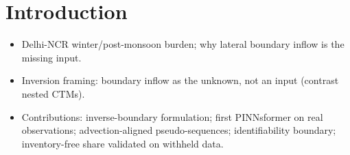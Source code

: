 \section{Introduction}
\begin{itemize}
  \item Delhi-NCR winter/post-monsoon burden; why lateral boundary inflow is the missing input.
  \item Inversion framing: boundary inflow as the unknown, not an input (contrast nested CTMs).
  \item Contributions: inverse-boundary formulation; first PINNsformer on real observations; advection-aligned pseudo-sequences; identifiability boundary; inventory-free share validated on withheld data.
\end{itemize}
